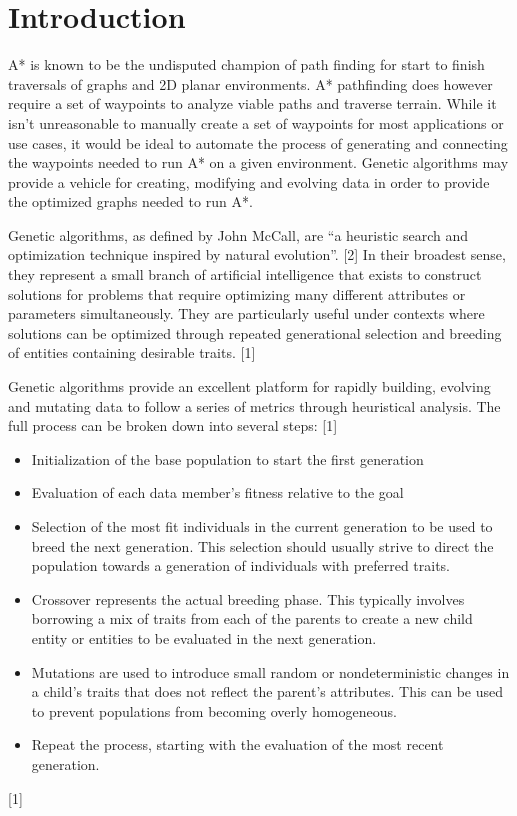 \section{Introduction}
	A* is known to be the undisputed champion of path finding for start to finish traversals of graphs and 2D planar environments. A* pathfinding does however require a set of waypoints to analyze viable paths and traverse terrain. While it isn’t unreasonable to manually create a set of waypoints for most applications or use cases, it would be ideal to automate the process of generating and connecting the waypoints needed to run A* on a given environment. Genetic algorithms may provide a vehicle for creating, modifying and evolving data in order to provide the optimized graphs needed to run A*.
	
	Genetic algorithms, as defined by John McCall, are “a heuristic search and optimization technique inspired by natural evolution”. [2] In their broadest sense, they represent a small branch of artificial intelligence that exists to construct solutions for problems that require optimizing many different attributes or parameters simultaneously. They are particularly useful under contexts where solutions can be optimized through repeated generational selection and breeding of entities containing desirable traits. [1]
	
	Genetic algorithms provide an excellent platform for rapidly building, evolving and mutating data to follow a series of metrics through heuristical analysis. The full process can be broken down into several steps: [1]
	
	\begin{itemize}
		\item Initialization of the base population to start the first generation
		\item Evaluation of each data member’s fitness relative to the goal
		\item Selection of the most fit individuals in the current generation to be used to breed the next generation. This selection should usually strive to direct the population towards a generation of individuals with preferred traits.
		\item Crossover represents the actual breeding phase. This typically involves borrowing a mix of traits from each of the parents to create a new child entity or entities to be evaluated in the next generation.
		\item Mutations are used to introduce small random or nondeterministic changes in a child’s traits that does not reflect the parent’s attributes. This can be used to prevent populations from becoming overly homogeneous.
		\item Repeat the process, starting with the evaluation of the most recent generation.
	\end{itemize}
	[1]
	

